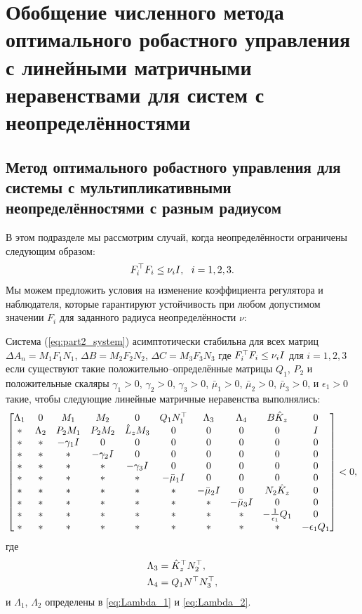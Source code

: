 \chapter{Обобщение численного метода оптимального робастного управления  с линейными матричными неравенствами для систем с неопределённостями}\label{ch:ch4}
\section{Метод оптимального робастного управления для системы с мультипликативными неопределённостями с разным радиусом}\label{sec:ch4/sect1}

В этом подразделе мы рассмотрим случай, когда неопределённости ограничены следующим образом:
%
\begin{equation}
	\label{eq:part2_nu_uncertainty}
	{F}_i^\top{F}_i\leq \nu_i {I}, \ \ i=1,2,3.
\end{equation}
%
Мы можем предложить условия на изменение коэффициента регулятора и наблюдателя, которые гарантируют устойчивость при любом допустимом значении ${F}_i$ для заданного радиуса неопределённости $\nu$:
\begin{theorem}\label{thm:part2_LMI_2}
	Система (\ref{eq:part2_system}) асимптотически стабильна для всех матриц
	$\Delta {A}_n={M}_1{F}_1{N}_1$, 
	$\Delta {B}= {M}_2{F}_2{N}_2$, 
	$\Delta {C} = {M}_3{F}_3{N}_3$
	где
	${F}_i^\top{F}_i\leq \nu_i {I}$ для $i=1,2,3$
	если существуют такие положительно--определённые матрицы ${Q}_1$, ${P}_2$ и положительные скаляры
	$\gamma_1>0$, $\gamma_2>0$, $\gamma_3>0$, $\bar{\mu}_1>0$, $\bar{\mu}_2>0$, $\bar{\mu}_3>0$, и $\epsilon_1 > 0$ такие, чтобы следующие линейные матричные неравенства выполнялись:
	\begin{equation}
		\label{eq:thm4_final_LMI}
		\begin{bmatrix}
			{\Lambda}_1 & 0 & {M}_1 & {M}_2&0 & {Q}_1{N}_1^\top & {\Lambda}_3 &{\Lambda}_4 & {B}\hat{{K}}_z & 0\\
			* & {\Lambda}_2 & {P}_2{M}_1 & {P}_2{M}_2 & \hat{{L}}_z{M}_3& 0& 0&0&0&{I} \\
			* & * & -\gamma_1{I} & 0&0&0&0&0&0&0\\
			* & * &*  & -\gamma_2{I}&0&0&0&0&0&0\\
			*& * & * &*  & -\gamma_3{I}&0&0&0&0&0\\
			* &* & * & * & *&-\bar{\mu}_1{I}&0&0&0&0\\
			* & * & * &*& *&*&-\bar{\mu}_2{I}& 0&{N}_2\hat{{K}}_z&0\\
			*&*&* &* & * & * & *&-\bar{\mu}_3{I}&0&0\\
			* & * & *&*&* & *&*&*&-\frac{1}{\epsilon_1}{Q}_1&0\\
			* & * & * & *&*&*&*&*&*&-\epsilon_1{Q}_1\\
		\end{bmatrix}<0,
	\end{equation}
	где
	\begin{align}
		{\Lambda}_3&=\hat{{K}}_z^\top{N}_2^\top,\\ {\Lambda}_4&={Q}_1{N}^\top{N}_3^\top,
	\end{align}
	и ${\Lambda}_1$, ${\Lambda}_2$ определены в \eqref{eq:Lambda_1} и \eqref{eq:Lambda_2}. 
\end{theorem}
